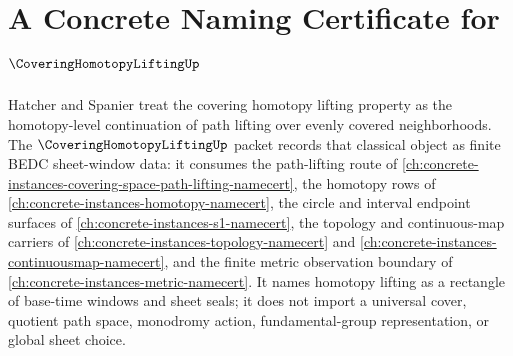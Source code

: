 \chapter{A Concrete Naming Certificate for $\CoveringHomotopyLiftingUp$}
\label{ch:concrete-instances-covering-homotopy-lifting-namecert}

Hatcher and Spanier treat the covering homotopy lifting property as the homotopy-level continuation of path lifting over evenly covered neighborhoods. The $\CoveringHomotopyLiftingUp$ packet records that classical object as finite BEDC sheet-window data: it consumes the path-lifting route of \autoref{ch:concrete-instances-covering-space-path-lifting-namecert}, the homotopy rows of \autoref{ch:concrete-instances-homotopy-namecert}, the circle and interval endpoint surfaces of \autoref{ch:concrete-instances-s1-namecert}, the topology and continuous-map carriers of \autoref{ch:concrete-instances-topology-namecert} and \autoref{ch:concrete-instances-continuousmap-namecert}, and the finite metric observation boundary of \autoref{ch:concrete-instances-metric-namecert}. It names homotopy lifting as a rectangle of base-time windows and sheet seals; it does not import a universal cover, quotient path space, monodromy action, fundamental-group representation, or global sheet choice.

